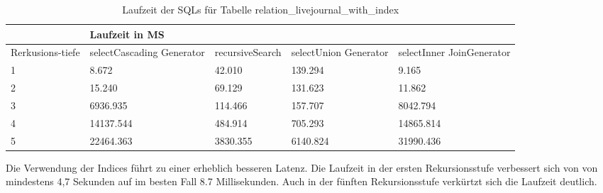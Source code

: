 \begin{table}[H]
	\centering
	\begin{tabular}{l|l|l|l|l|l|}
		\cline{2-6}
		& \multicolumn{5}{|l|}{Laufzeit in MS}                                                                                                                                                  \\ \hline
		\multicolumn{1}{|l|}{\multirow{2}{2cm}{Rerkusions-tiefe}} & \multicolumn{2}{|l|}{\multirow{2}{3cm}{selectCascading Generator}} & \multirow{2}{2.8cm}{recursiveSearch} & \multirow{2}{2.5cm}{selectUnion Generator} & \multirow{2}{2.5cm}{selectInner JoinGenerator} \\
		\multicolumn{1}{|l|}{}
		& \multicolumn{2}{|l|}{}                                           &                                  &                                     &                                           \\ \hline
		
		
		\multicolumn{1}{|l|}{1}                                 & \multicolumn{2}{l|}{8.672}                                       & 42.010                                                & 139.294                                                   & 9.165                                                           \\ \hline
		\multicolumn{1}{|l|}{2}                                 & \multicolumn{2}{l|}{15.240}                                      & 69.129                                                & 131.623                                                   & 11.862                                                          \\ \hline
		\multicolumn{1}{|l|}{3}                                 & \multicolumn{2}{l|}{6936.935}                                    & 114.466                                               & 157.707                                                   & 8042.794                                                        \\ \hline
		\multicolumn{1}{|l|}{4}                                 & \multicolumn{2}{l|}{14137.544}                                   & 484.914                                               & 705.293                                                   & 14865.814                                                       \\ \hline
		\multicolumn{1}{|l|}{5}                                 & \multicolumn{2}{l|}{22464.363}                                   & 3830.355                                              & 6140.824                                                  & 31990.436                                                       \\ \hline
	\end{tabular}
	\caption{Laufzeit der SQLs für Tabelle relation\_livejournal\_with\_index}
\end{table}
Die Verwendung der Indices führt zu einer erheblich besseren Latenz. Die Laufzeit in der ersten Rekursionsstufe verbessert sich von von mindestens 4,7 Sekunden auf im besten Fall 8.7 Millisekunden. Auch in der fünften Rekursionsstufe verkürtzt sich die Laufzeit deutlich.

